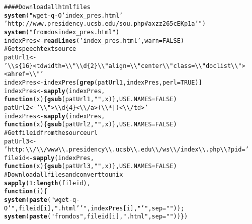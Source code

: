 \documentclass{article}\usepackage{graphicx, color}
\makeatletter
\newcommand{\hlfunctioncall}[1]{\textcolor[rgb]{0.501960784313725,0,0.329411764705882}{\textbf{#1}}}%
\newcommand{\hlstring}[1]{\textcolor[rgb]{0.6,0.6,1}{#1}}%
\newcommand{\hlcomment}[1]{\textcolor[rgb]{0.180392156862745,0.6,0.341176470588235}{#1}}%
\newenvironment{kframe}{%
 \def\at@end@of@kframe{}%
 \ifinner\ifhmode%
  \def\at@end@of@kframe{\end{minipage}}%
  \begin{minipage}{\columnwidth}%
 \fi\fi%
 \def\FrameCommand##1{\hskip\@totalleftmargin \hskip-\fboxsep
 \colorbox{shadecolor}{##1}\hskip-\fboxsep
     \hskip-\linewidth \hskip-\@totalleftmargin \hskip\columnwidth}%
 \MakeFramed {\advance\hsize-\width
   \@totalleftmargin\z@ \linewidth\hsize
   \@setminipage}}%
 {\par\unskip\endMakeFramed%
 \at@end@of@kframe}
\newenvironment{knitrout}{}{} %
\makeatother
\begin{document}
\begin{knitrout}
\color{fgcolor}\begin{kframe}
\begin{alltt}
 \hlcomment{#### Download all html files}
 \hlfunctioncall{system}("wget -q -O \hlstring{'index_pres.html'} 
         \hlstring{'http://www.presidency.ucsb.edu/sou.php#axzz265cEKp1a'}")
 \hlfunctioncall{system}(\hlstring{"fromdos index_pres.html"})
 indexPres <- \hlfunctioncall{readLines}(\hlstring{'index_pres.html'},warn= FALSE)
 \hlcomment{# Get speech text source}
 patUrl1 <- 
 \hlstring{'\textbackslash{}\textbackslash{}s\{16\}<td width=\textbackslash{}\textbackslash{}\hlstring{"\textbackslash{}\textbackslash{}d\{2\}\textbackslash{}\textbackslash{}"} align=\textbackslash{}\textbackslash{}\hlstring{"center\textbackslash{}\textbackslash{}"} class=\textbackslash{}\textbackslash{}\hlstring{"doclist\textbackslash{}\textbackslash{}"}><a href=\textbackslash{}\textbackslash{}"'}
 indexPres <- indexPres[\hlfunctioncall{grep}(patUrl1,indexPres,perl= TRUE)]
 indexPres <- \hlfunctioncall{sapply}(indexPres, 
                     \hlfunctioncall{function}(x)\{\hlfunctioncall{gsub}(patUrl1,\hlstring{""},x)\},USE.NAMES= FALSE)
 patUrl2 <- \hlstring{'\textbackslash{}\textbackslash{}">\textbackslash{}\textbackslash{}d\{4\}<\textbackslash{}\textbackslash{}/a>(\textbackslash{}\textbackslash{}*|)<\textbackslash{}\textbackslash{}/td>'}
 indexPres <- \hlfunctioncall{sapply}(indexPres, 
                     \hlfunctioncall{function}(x)\{\hlfunctioncall{gsub}(patUrl2,\hlstring{""},x)\},USE.NAMES= FALSE)
 \hlcomment{# Get file id from the source url}
 patUrl3 <- 
 \hlstring{'http:\textbackslash{}\textbackslash{}/\textbackslash{}\textbackslash{}/www\textbackslash{}\textbackslash{}.presidency\textbackslash{}\textbackslash{}.ucsb\textbackslash{}\textbackslash{}.edu\textbackslash{}\textbackslash{}/ws\textbackslash{}\textbackslash{}/index\textbackslash{}\textbackslash{}.php\textbackslash{}\textbackslash{}?pid='}
 fileid <- \hlfunctioncall{sapply}(indexPres, 
                  \hlfunctioncall{function}(x)\{\hlfunctioncall{gsub}(patUrl3,\hlstring{""},x)\},USE.NAMES= FALSE)
 \hlcomment{# Download all files and convert to unix}
 \hlfunctioncall{sapply}(1:\hlfunctioncall{length}(fileid),
        \hlfunctioncall{function}(i)\{
        \hlfunctioncall{system}(\hlfunctioncall{paste}(\hlstring{"wget -q -O \hlstring{'"},fileid[i],\hlstring{".html'} \hlstring{'"},indexPres[i],\hlstring{"'}"},sep=\hlstring{""}));
        \hlfunctioncall{system}(\hlfunctioncall{paste}(\hlstring{"fromdos "},fileid[i],\hlstring{".html"},sep=\hlstring{""}))\})
\end{alltt}
\end{kframe}
\end{knitrout}
\end{document}
